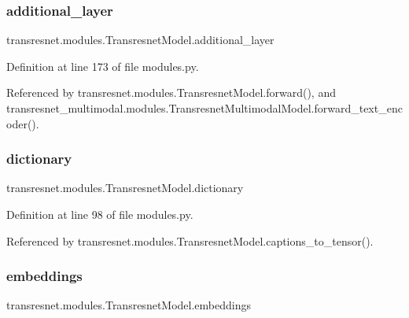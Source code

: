 \subsubsection{\texorpdfstring{additional\+\_\+layer}{additional\_layer}}
{\footnotesize\ttfamily transresnet.\+modules.\+Transresnet\+Model.\+additional\+\_\+layer}



Definition at line 173 of file modules.\+py.



Referenced by transresnet.\+modules.\+Transresnet\+Model.\+forward(), and transresnet\+\_\+multimodal.\+modules.\+Transresnet\+Multimodal\+Model.\+forward\+\_\+text\+\_\+encoder().

\mbox{\label{classtransresnet_1_1modules_1_1TransresnetModel_a9755441a27672c7126eea150daaee0c1}} 
\subsubsection{\texorpdfstring{dictionary}{dictionary}}
{\footnotesize\ttfamily transresnet.\+modules.\+Transresnet\+Model.\+dictionary}



Definition at line 98 of file modules.\+py.



Referenced by transresnet.\+modules.\+Transresnet\+Model.\+captions\+\_\+to\+\_\+tensor().

\mbox{\label{classtransresnet_1_1modules_1_1TransresnetModel_ac423b03e2d7c2e0e845e922ba6be8d2b}} 
\subsubsection{\texorpdfstring{embeddings}{embeddings}}
{\footnotesize\ttfamily transresnet.\+modules.\+Transresnet\+Model.\+embeddings}



